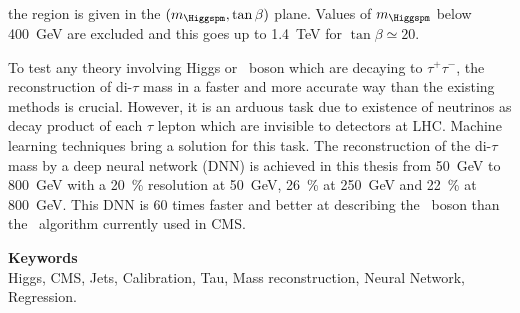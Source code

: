 the region is given in the $(m_{\Higgspm},\tan\beta)$ plane.
Values of $m_{\Higgspm}$ below \SI{400}{\GeV} are excluded
and this goes up to 
\SI{1.4}{\TeV} for $\tan\beta\simeq\num{20}$.
\par
To test any theory involving Higgs or \Zboson\ boson which are decaying to $\tau^+ \tau^-$,
the reconstruction of di-$\tau$ mass in a faster and more accurate way than the existing methods is crucial. 
However, it is an arduous task due to existence of neutrinos as decay product of each $\tau$ lepton which are invisible to detectors at LHC. 
Machine learning techniques bring a solution for this task. 
The reconstruction of the di-$\tau$ mass by a deep neural network (DNN)
is achieved in this thesis
from 
\SI{50}{\GeV} to \SI{800}{\GeV}
with a
\SI{20}{\%} resolution at \SI{50}{\GeV},
\SI{26}{\%} at \SI{250}{\GeV} and
\SI{22}{\%} at \SI{800}{\GeV}.
This DNN is
60 times faster
and
better at describing the \Zboson~boson
than the \SVFIT\ algorithm currently used in CMS.

\vfill

\noindent\textbf{\Large\sffamily Keywords}\\
Higgs,
CMS,
Jets,
Calibration,
Tau,
Mass reconstruction,
Neural Network,
Regression.

\vspace{2\baselineskip}
